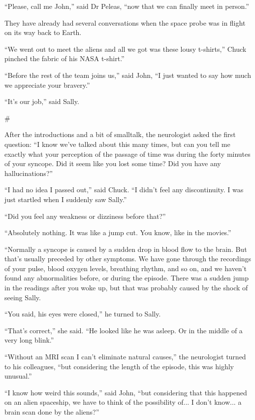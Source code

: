 \documentclass[12pt]{book}
\newcommand{\sbreak}{
\begin{center}
  \#
\end{center}
}
\begin{document}
``Please, call me John,'' said Dr Peleas, ``now that we can finally meet in person.''

They have already had several conversations when the space probe was in flight on its way back to Earth. 

``We went out to meet the aliens and all we got was these lousy t-shirts,'' Chuck pinched the fabric of his NASA t-shirt.''

``Before the rest of the team joins us,'' said John, ``I just wanted to say how much we appreciate your bravery.'' 

``It's our job,'' said Sally.

\sbreak

After the introductions and a bit of smalltalk, the neurologist asked the first question:
``I know we've talked about this many times, but can you tell me exactly what your perception of the passage of time was during the forty minutes of your syncope. Did it seem like you lost some time? Did you have any hallucinations?''

``I had no idea I passed out,'' said Chuck. ``I didn't feel any discontinuity. I was just startled when I suddenly saw Sally.'' 

``Did you feel any weakness or dizziness before that?''

``Absolutely nothing. It was like a jump cut. You know, like in the movies.''

``Normally a syncope is caused by a sudden drop in blood flow to the brain. But that's usually preceded by other symptoms. We have gone through the recordings of your pulse, blood oxygen levels, breathing rhythm, and so on, and we haven't found any abnormalities before, or during the episode. There was a sudden jump in the readings after you woke up, but that was probably caused by the shock of seeing Sally.

``You said, his eyes were closed,'' he turned to Sally.

``That's correct,'' she said. ``He looked like he was asleep. Or in the middle of a very long blink.''

``Without an MRI scan I can't eliminate natural causes,'' the neurologist turned to his colleagues, ``but considering the length of the episode, this was highly unusual.''

``I know how weird this sounds,'' said John, ``but considering that this happened on an alien spaceship, we have to think of the possibility of... I don't know... a brain scan done by the aliens?''
\end{document}
